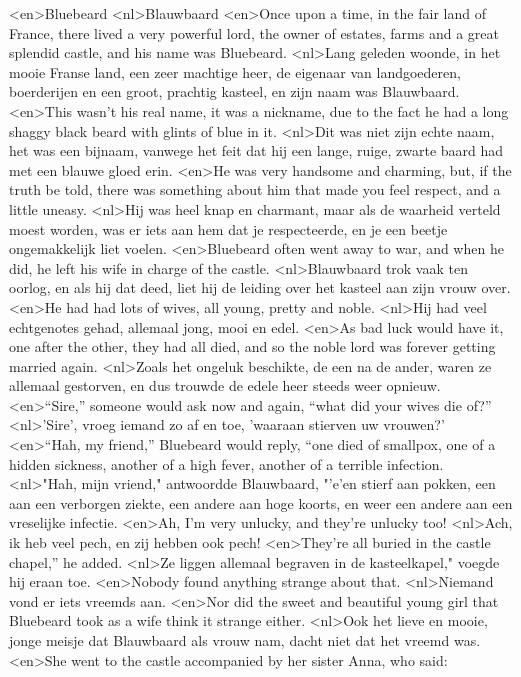 <en>Bluebeard
<nl>Blauwbaard
<en>Once upon a time, in the fair land of France, there lived a very powerful lord, the owner of estates, farms and a great splendid castle, and his name was Bluebeard.
<nl>Lang geleden woonde, in het mooie Franse land, een zeer machtige heer, de eigenaar van landgoederen, boerderijen en een groot, prachtig kasteel, en zijn naam was Blauwbaard.
<en>This wasn’t his real name, it was a nickname, due to the fact he had a long shaggy black beard with glints of blue in it.
<nl>Dit was niet zijn echte naam, het was een bijnaam, vanwege het feit dat hij een lange, ruige, zwarte baard had met een blauwe gloed erin.
<en>He was very handsome and charming, but, if the truth be told, there was something about him that made you feel respect, and a little uneasy.
<nl>Hij was heel knap en charmant, maar als de waarheid verteld moest worden, was er iets aan hem dat je respecteerde, en  je een beetje ongemakkelijk liet voelen.
<en>Bluebeard often went away to war, and when he did, he left his wife in charge of the castle.
<nl>Blauwbaard trok vaak ten oorlog, en als hij dat deed, liet hij de leiding   over het kasteel aan zijn vrouw over.
<en>He had had lots of wives, all young, pretty and noble.
<nl>Hij had veel echtgenotes gehad, allemaal jong, mooi en edel.
<en>As bad luck would have it, one after the other, they had all died, and so the noble lord was forever getting married again.
<nl>Zoals het ongeluk beschikte, de een na de ander, waren ze allemaal gestorven, en dus trouwde de edele heer steeds weer opnieuw.
<en>“Sire,” someone would ask now and again, “what did your wives die of?”
<nl>'Sire', vroeg  iemand zo af en toe, 'waaraan stierven uw vrouwen?'
<en>“Hah, my friend,” Bluebeard would reply, “one died of smallpox, one of a hidden sickness, another of a high fever, another of a terrible infection.
<nl>"Hah, mijn vriend," antwoordde Blauwbaard, "'e'en stierf aan pokken, een aan een verborgen ziekte, een andere aan hoge koorts, en  weer een andere aan een vreselijke infectie.
<en>Ah, I’m very unlucky, and they’re unlucky too!
<nl>Ach, ik heb veel pech, en zij hebben ook pech!
<en>They’re all buried in the castle chapel,” he added.
<nl>Ze liggen allemaal begraven in de kasteelkapel," voegde hij eraan toe.
<en>Nobody found anything strange about that.
<nl>Niemand vond er iets vreemds aan.
<en>Nor did the sweet and beautiful young girl that Bluebeard took as a wife think it strange either.
<nl>Ook het lieve en mooie, jonge meisje  dat Blauwbaard als vrouw nam, dacht niet dat het vreemd was.
<en>She went to the castle accompanied by her sister Anna, who said:
